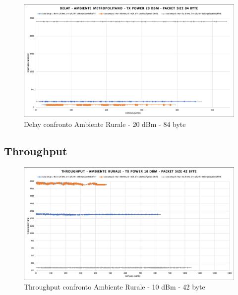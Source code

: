\documentclass[12pt,a4paper,openright,twoside]{report}
\begin{document}
\begin{figure}[h]                      
\begin{center} 
\includegraphics[width=\textwidth]{DELAY_confronto_AM_20dBm_84byte.png}
\caption[Delay confronto Ambiente Rurale - 20 dBm - 84 byte]{Delay confronto Ambiente Rurale - 20 dBm - 84 byte}\label{fig:prima}
\end{center}
\end{figure}

\subsection{Throughput}
\begin{figure}[h]                      
\begin{center} 
\includegraphics[width=\textwidth]{THROUGHPUT_confronto_AR_10dBm_42byte.png}
\caption[Throughput confronto Ambiente Rurale - 10 dBm - 42 byte]{Throughput confronto Ambiente Rurale - 10 dBm - 42 byte}\label{fig:prima}
\end{center}
\end{figure}
\end{document}
